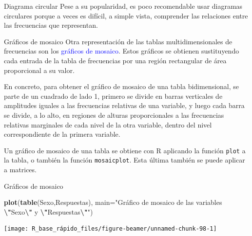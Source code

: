 \documentclass[
  ignorenonframetext,
  aspectratio=169]{beamer}
\newenvironment{Shaded}{\begin{snugshade}}{\end{snugshade}}
\newcommand{\AttributeTok}[1]{\textcolor[rgb]{0.13,0.29,0.53}{#1}}
\newcommand{\FunctionTok}[1]{\textcolor[rgb]{0.13,0.29,0.53}{\textbf{#1}}}
\newcommand{\NormalTok}[1]{#1}
\newcommand{\SpecialCharTok}[1]{\textcolor[rgb]{0.81,0.36,0.00}{\textbf{#1}}}
\newcommand{\StringTok}[1]{\textcolor[rgb]{0.31,0.60,0.02}{#1}}
\newcommand\blue[1]{\textcolor{blue}{#1}}
\begin{document}
\begin{frame}{Diagrama circular}
\label{diagrama-circular-3}
Pese a su popularidad, es poco recomendable usar diagramas circulares
porque a veces es difícil, a simple vista, comprender las relaciones
entre las frecuencias que representan.
\end{frame}

\begin{frame}[fragile]{Gráficos de mosaico}
\label{gruxe1ficos-de-mosaico}
Otra representación de las tablas multidimensionales de frecuencias son
los \blue{gráficos de mosaico}. Estos gráficos se obtienen sustituyendo
cada entrada de la tabla de frecuencias por una región rectangular de
área proporcional a su valor.

En concreto, para obtener el gráfico de mosaico de una tabla
bidimensional, se parte de un cuadrado de lado 1, primero se divide en
barras verticales de amplitudes iguales a las frecuencias relativas de
una variable, y luego cada barra se divide, a lo alto, en regiones de
alturas proporcionales a las frecuencias relativas marginales de cada
nivel de la otra variable, dentro del nivel correspondiente de la
primera variable.

Un gráfico de mosaico de una tabla se obtiene con R aplicando la función
\texttt{plot} a la tabla, o también la función \texttt{mosaicplot}. Esta
última también se puede aplicar a matrices.
\end{frame}

\begin{frame}[fragile]{Gráficos de mosaico}
\label{gruxe1ficos-de-mosaico-1}
\begin{Shaded}
\begin{Highlighting}[]
\FunctionTok{plot}\NormalTok{(}\FunctionTok{table}\NormalTok{(Sexo,Respuestas), }
\AttributeTok{main=}\StringTok{"Gráfico de mosaico de las variables}
\StringTok{  }\SpecialCharTok{\textbackslash{}"}\StringTok{Sexo}\SpecialCharTok{\textbackslash{}"}\StringTok{ y }\SpecialCharTok{\textbackslash{}"}\StringTok{Respuestas}\SpecialCharTok{\textbackslash{}"}\StringTok{"}\NormalTok{)}
\end{Highlighting}
\end{Shaded}

\begin{center}\texttt{[image: R\_base\_rápido\_files/figure-beamer/unnamed-chunk-98-1]} \end{center}
\end{frame}
\end{document}
